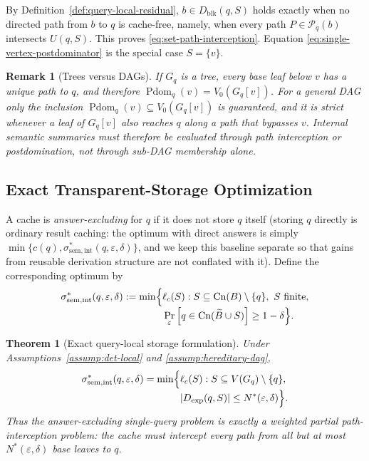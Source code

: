 \documentclass[journal]{IEEEtran}
\makeatletter
\newcommand{\Cn}{\text{Cn}}
\newtheorem{theorem}{Theorem}[section]
\newtheorem{remark}{Remark}[section]
\numberwithin{equation}{section}
\renewenvironment{proof}[1][\proofname]{\par
  \pushQED{\qed}%
  \normalfont \topsep6\p@\@plus6\p@\relax
  \trivlist
  \item[\hskip\labelsep
        \itshape
    #1\@addpunct{.}]\ignorespaces
}{%
  \popQED\endtrivlist\@endpefalse
}
\makeatother
\begin{document}
\begin{proof}
By Definition~\ref{def:query-local-residual}, \(b\in D_{\mathrm{blk}}(q,S)\)
holds exactly when no directed path from \(b\) to \(q\) is cache-free, namely,
when every path \(P\in\mathcal P_q(b)\) intersects \(U(q,S)\).  This proves
\eqref{eq:set-path-interception}.  Equation
\eqref{eq:single-vertex-postdominator} is the special case \(S=\{v\}\).
\end{proof}

\begin{remark}[Trees versus DAGs]
\label{rem:tree-versus-dag}
If \(G_q\) is a tree, every base leaf below \(v\) has a unique path to
\(q\), and therefore \(\operatorname{Pdom}_q(v)=V_0(G_q[v])\).  For a
general DAG only the inclusion
\(\operatorname{Pdom}_q(v)\subseteq V_0(G_q[v])\) is guaranteed, and it is
strict whenever a leaf of \(G_q[v]\) also reaches \(q\) along a path that
bypasses \(v\).  Internal semantic summaries must therefore be evaluated
through path interception or postdomination, not through sub-DAG membership
alone.
\end{remark}

\subsection{Exact Transparent-Storage Optimization}
\label{subsec:exact-storage-optimization}

A cache is \emph{answer-excluding} for \(q\) if it does not store \(q\)
itself (storing \(q\) directly is ordinary result caching: the optimum with
direct answers is simply
\(\min\{c(q),\sigma_{\mathrm{sem,int}}^*(q,\varepsilon,\delta)\}\), and
we keep this baseline separate so that gains from reusable derivation
structure are not conflated with it).  Define the corresponding optimum by
\begin{align}
  \sigma_{\mathrm{sem,int}}^*
  (q,\varepsilon,\delta)
  :=
  \min\Bigl\{
    &\ell_c(S):
    S\subseteq\Cn(B)\setminus\{q\},
    \ S\text{ finite},
    \nonumber\\[-1mm]
    &\Pr_{\varepsilon}
      \left[
        q\in\Cn(\widetilde B\cup S)
      \right]
      \ge 1-\delta
  \Bigr\}.
\label{eq:def-semantic-internal-optimum}
\end{align}

\begin{theorem}[Exact query-local storage formulation]
\label{thm:exact-single-query-opt}
Under Assumptions~\ref{assump:det-local} and
\ref{assump:hereditary-dag},
\begin{align}
  \sigma_{\mathrm{sem,int}}^*
  (q,\varepsilon,\delta)
  =
  \min\Bigl\{
    &\ell_c(S):
    S\subseteq V(G_q)\setminus\{q\},
    \nonumber\\[-1mm]
    &|D_{\mathrm{exp}}(q,S)|
      \le N^*(\varepsilon,\delta)
  \Bigr\}.
\label{eq:exact-single-query-opt}
\end{align}
Thus the answer-excluding single-query problem is exactly a weighted partial
path-interception problem: the cache must intercept every path from all but at
most \(N^*(\varepsilon,\delta)\) base leaves to \(q\).
\end{theorem}
\end{document}
